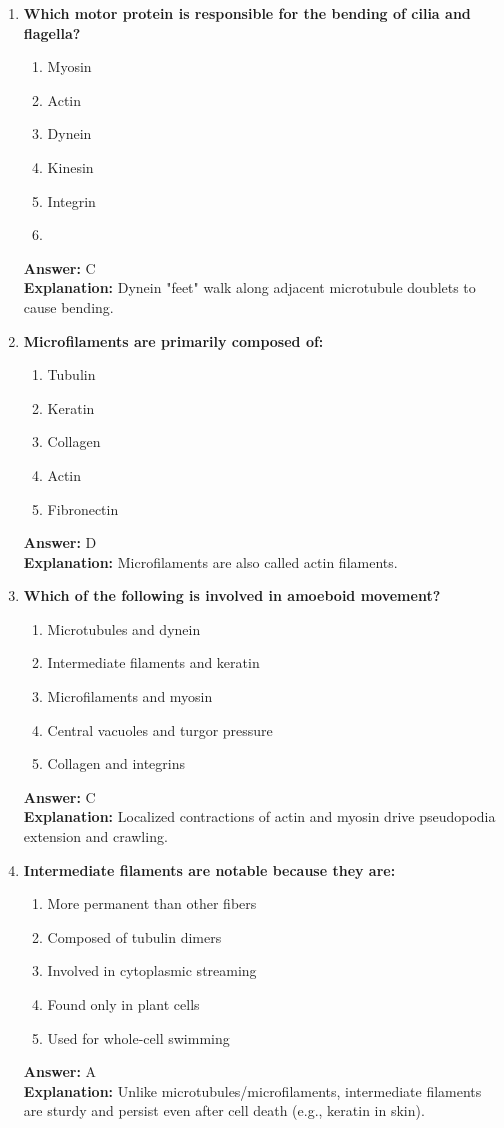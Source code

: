 \documentclass[11pt, a4paper]{article}
\begin{document}
\begin{enumerate}[leftmargin=*, label=\arabic*.]
\item \textbf{Which motor protein is responsible for the bending of cilia and flagella?}
\begin{enumerate}[label=\Alph*.]
\item Myosin
\item Actin
\item Dynein
\item Kinesin
\item Integrin
\item 
\end{enumerate}
\textbf{Answer:} C \\
\textbf{Explanation:} Dynein "feet" walk along adjacent microtubule doublets to cause bending.

\item \textbf{Microfilaments are primarily composed of:}
\begin{enumerate}[label=\Alph*.]
\item Tubulin
\item Keratin
\item Collagen
\item Actin
\item Fibronectin
\end{enumerate}
\textbf{Answer:} D \\
\textbf{Explanation:} Microfilaments are also called actin filaments.

\item \textbf{Which of the following is involved in amoeboid movement?}
\begin{enumerate}[label=\Alph*.]
\item Microtubules and dynein
\item Intermediate filaments and keratin
\item Microfilaments and myosin
\item Central vacuoles and turgor pressure
\item Collagen and integrins
\end{enumerate}
\textbf{Answer:} C \\
\textbf{Explanation:} Localized contractions of actin and myosin drive pseudopodia extension and crawling.

\item \textbf{Intermediate filaments are notable because they are:}
\begin{enumerate}[label=\Alph*.]
\item More permanent than other fibers
\item Composed of tubulin dimers
\item Involved in cytoplasmic streaming
\item Found only in plant cells
\item Used for whole-cell swimming
\end{enumerate}
\textbf{Answer:} A \\
\textbf{Explanation:} Unlike microtubules/microfilaments, intermediate filaments are sturdy and persist even after cell death (e.g., keratin in skin).


\end{enumerate}
\end{document}
